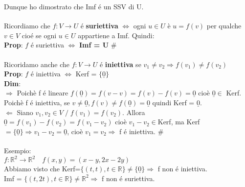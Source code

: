 \documentclass[12pt]{article}
\begin{document}
Dunque ho dimostrato che Imf é un SSV di U.\\\\
Ricordiamo che $f:V \longrightarrow U$ é \textbf{suriettiva} $\iff$ ogni $u\in U$ è $u=f(v)$ per qualche $v\in V$ cioé se ogni $u\in U$ appartiene a Imf. Quindi:\\
\textbf{Prop}: $f$ é suriettiva $\iff$ \textbf{Imf = U} \# \\\\
Ricoridamo anche che $f:V\longrightarrow U$ é \textbf{iniettiva} se $v_1\neq v_2 \Rightarrow f(v_1) \neq f(v_2)$\\
\textbf{Prop}: $f$ é iniettiva $\iff$ Kerf = $\{\underline{0}\}$\\
\textbf{Dim}:\\
$\Rightarrow$ Poichè f é lineare $f(\underline{0}) = f(v-v) = f(v) -f(v) = \underline{0}$ cioè $\underline{0}\in$ Kerf. Poichè f é iniettiva, se $v\neq \underline{0}, f(v)\neq f(\underline{0})=\underline{0}$ quindi Kerf = $\underline{0}$.\\
$\Leftarrow$ Siano $v_1,v_2\in V \;/\; f(v_1) = f(v_2)$. Allora $\underline{0} = f(v_1)-f(v_2) = f(v_1-v_2)$ cioè $v_1-v_2 \in $Kerf, ma Kerf$=\{\underline{0}\}\Longrightarrow v_1-v_2 = \underline{0}$, cioè $v_1=v_2 \Rightarrow$ f é iniettiva. \# \\\\
Esempio:\\
$f:\mathbb{R}^2\longrightarrow \mathbb{R}^2\quad f(x,y)=(x-y, 2x-2y)$\\
Abbiamo visto che Kerf=$\{(t,t), t\in \mathbb{R}\} \neq \{\underline{0}\} \Rightarrow$ f non é iniettiva.\\
Imf = $\{(t,2t), t\in \mathbb{R}\} \neq \mathbb{R}^2 \Rightarrow$ f non é suriettiva.\\
\end{document}

